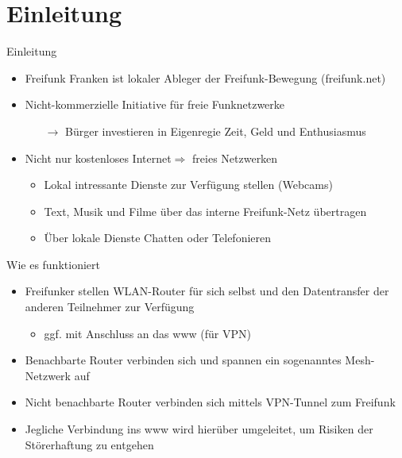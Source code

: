 \section{Einleitung}

\begin{frame}{Einleitung}
    \begin{itemize}
        \item Freifunk Franken ist lokaler Ableger der Freifunk-Bewegung (freifunk.net)
        \item Nicht-kommerzielle Initiative für freie Funknetzwerke\\
        \begin{itemize}
            \item[$\rightarrow$] Bürger investieren in Eigenregie Zeit, Geld und Enthusiasmus
        \end{itemize}
        \item Nicht nur \glqq{}kostenloses Internet\grqq $\Rightarrow$ \glqq{}freies Netzwerken\grqq\\
        \begin{itemize}
            \item Lokal intressante Dienste zur Verfügung stellen (Webcams)
            \item Text, Musik und Filme über das interne Freifunk-Netz übertragen
            \item Über lokale Dienste Chatten oder Telefonieren
        \end{itemize}
    \end{itemize}
\end{frame}

\begin{frame}{Wie es funktioniert}
    \begin{itemize}
        \item Freifunker stellen WLAN-Router für sich selbst und den Datentransfer der anderen Teilnehmer zur Verfügung
        \begin{itemize}
            \item ggf. mit Anschluss an das www (für VPN)
        \end{itemize}
        \item Benachbarte Router verbinden sich und spannen ein sogenanntes Mesh-Netzwerk auf
        \item Nicht benachbarte Router verbinden sich mittels VPN-Tunnel zum Freifunk
        \item Jegliche Verbindung ins www wird hierüber umgeleitet, um Risiken der Störerhaftung zu entgehen
    \end{itemize}
\end{frame}

